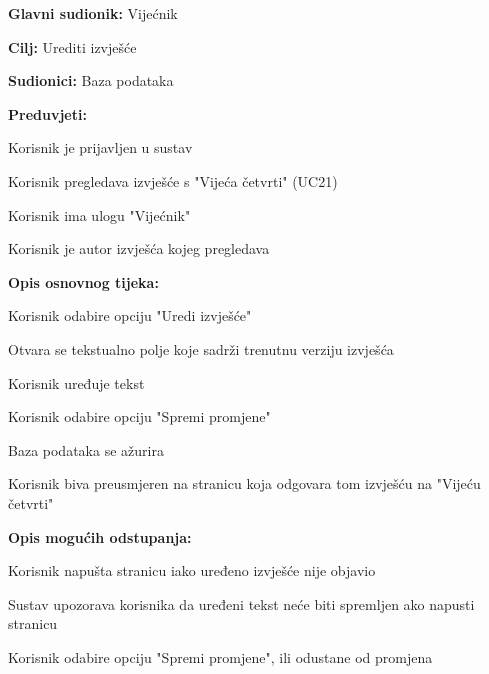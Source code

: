 					\begin{packed_item}
	
						\item \textbf{Glavni sudionik: }Vijećnik
						\item  \textbf{Cilj:} Urediti izvješće
						\item  \textbf{Sudionici:} Baza podataka
						\item  \textbf{Preduvjeti:}
						\item[] \begin{packed_enum}
							\item Korisnik je prijavljen u sustav
							\item Korisnik pregledava izvješće s "Vijeća četvrti" (UC21)
							\item Korisnik ima ulogu "Vijećnik"
							\item Korisnik je autor izvješća kojeg pregledava
						\end{packed_enum}
						\item  \textbf{Opis osnovnog tijeka:}
						
						\item[] \begin{packed_enum}
	
							\item Korisnik odabire opciju "Uredi izvješće"
							\item Otvara se tekstualno polje koje sadrži trenutnu verziju izvješća
							\item Korisnik uređuje tekst
							\item Korisnik odabire opciju "Spremi promjene"
							\item Baza podataka se ažurira
							\item Korisnik biva preusmjeren na stranicu koja odgovara tom izvješću na "Vijeću četvrti"
							
							
							
						\end{packed_enum}
						\item  \textbf{Opis mogućih odstupanja:}
						
						\item[] \begin{packed_item}
						\item[4.a] Korisnik napušta stranicu iako uređeno izvješće nije objavio
							\item[] \begin{packed_enum}
								
								\item Sustav upozorava korisnika da uređeni tekst neće biti spremljen ako napusti stranicu
								\item Korisnik odabire opciju "Spremi promjene", ili odustane od promjena
								

\end{packed_enum}
\end{packed_item}
\end{packed_item}
